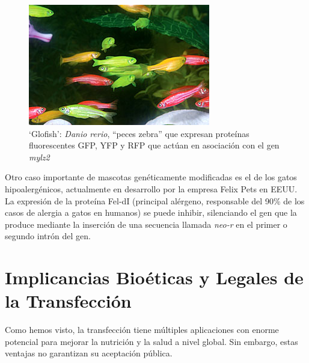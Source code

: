 \documentclass[fleqn,10pt]{SelfArx} %
\begin{document}
\begin{figure}[ht]\centering
\includegraphics[width=\linewidth]{images/danio}
\caption{`Glofish': \textit{Danio rerio}, ``peces zebra'' que expresan proteínas fluorescentes GFP, YFP y RFP que actúan en asociación con el gen \textit{mylz2} \cite{gong2003development, fox2008fda}}
\end{figure}    
    
    Otro caso importante de mascotas genéticamente modificadas es el de los gatos hipoalergénicos, actualmente en desarrollo por la empresa Felix Pets en EEUU. La expresión de la proteína Fel-dI (principal alérgeno, responsable del 90\% de los casos de alergia a gatos en humanos) se puede inhibir, silenciando el gen que la produce mediante la inserción de una secuencia llamada \textit{neo-r} en el primer o segundo intrón del gen\cite{avner2012method, butt2012hypoallergenic}. 
  
\section{Implicancias Bioéticas y Legales de la Transfección}

Como hemos visto, la transfección tiene múltiples aplicaciones con enorme potencial para mejorar la nutrición y la salud a nivel global. Sin embargo, estas ventajas no garantizan su aceptación pública.






\end{document}
